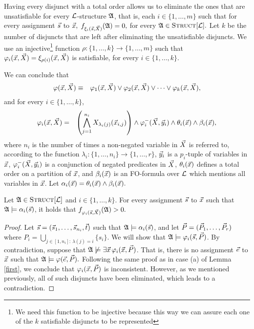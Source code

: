 Having every disjunct with a total order allows us to eliminate the ones that are unsatisfiable for every $\L$-structure $\A$, that is, each $i\in\{1,\ldots,m\}$ such that for every assignment $\s$ to $\x,$ $f_{\xi_i(\s,\X)}(\A) = 0,$ for every $\A\in\Truc.$ Let $k$ be the number of disjuncts that are left after eliminating the unsatisfiable disjuncts. We use an injective\footnote[3]{We need this function to be injective because this way we can assure each one of the $k$ satisfiable disjuncts to be represented} function $\rho:\{1,\ldots,k\}\to\{1,\ldots,m\}$ such that $\varphi_i(\x,\X) = \xi_{\rho(i)}(\x,\X)$ is satisfiable, for every $i\in\{1,\ldots,k\}.$

We can conclude that
\begin{eqnarray*}
\varphi(\x,\X) &\equiv& \varphi_1(\x,\X) \vee \varphi_2(\x,\X) \vee \dots  \vee \varphi_k(\x,\X),
\end{eqnarray*}
and for every $i\in\{1,\ldots,k\}$,
\begin{eqnarray*}
\varphi_i(\x,\X) &=& \left( \bigwedge_{j=1}^{n_i} X_{\lambda_i(j)}(\x_{i,j}) \right) \wedge \varphi^{-}_i(\X,\y_i) \wedge \theta_i(\x) \wedge \beta_i(\x),
\end{eqnarray*}
where $n_i$ is the number of times a non-negated variable in $\X$ is referred to, according to the function $\lambda_i:\{1,\ldots,n_i\}\to\{1,\ldots,r\}$, $\y_i$ is a $p_i$-tuple of variables in $\x$, $\varphi_i^{-}(\X,\y_i)$ is a conjunction of negated predicates in $\X$, $\theta_i(\x)$ defines a total order on a partition of $\x$, and $\beta_i(\x)$ is an FO-formula over $\L$ which mentions all variables in $\x$. Let $\alpha_i(\x) = \theta_i(\x)\wedge\beta_i(\x).$


\begin{claim} \label{alpha}
Let $\A\in\Truc$ and $i\in\{1,\ldots,k\}$. For every assignment $\s$ to $\x$ such that $\A\models\alpha_i(\s)$, it holds that $f_{\varphi_i(\s,\X)}(\A) > 0.$
\end{claim}
\begin{proof}
Let $\s = (\s_1,\ldots,\s_{n_i},\t)$ such that $\A\models\alpha_i(\s)$, and let $\P = (\P_1,\ldots,\P_r)$ where $P_i = \bigcup_{j\in[1,n_i]:\:\lambda(j)=i}\{s_i\}$. We will show that $\A\models\varphi_i(\s,\P)$. By contradiction, suppose that $\A\not\models\exists\x\,\varphi_i(\x,\P)$. That is, there is no assignment $\e$ to $\x$ such that $\A\models\varphi(\e,\P).$ Following the same proof as in case (a) of Lemma \ref{first}, we conclude that $\varphi_i(\x,\P)$ is inconsistent. However, as we mentioned previously, all of such disjuncts have been eliminated, which leads to a contradiction.
\end{proof}


